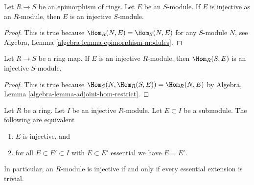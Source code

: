 \begin{lemma}
\label{lemma-injective-epimorphism}
Let $R \to S$ be an epimorphism of rings. Let $E$ be an $S$-module.
If $E$ is injective as an $R$-module, then $E$ is an injective $S$-module.
\end{lemma}

\begin{proof}
This is true because $\Hom_R(N, E) = \Hom_S(N, E)$ for any $S$-module $N$,
see Algebra, Lemma \ref{algebra-lemma-epimorphism-modules}.
\end{proof}

\begin{lemma}
\label{lemma-hom-injective}
Let $R \to S$ be a ring map. If $E$ is an injective $R$-module,
then $\Hom_R(S, E)$ is an injective $S$-module.
\end{lemma}

\begin{proof}
This is true because $\Hom_S(N, \Hom_R(S, E)) = \Hom_R(N, E)$ by
Algebra, Lemma \ref{algebra-lemma-adjoint-hom-restrict}.
\end{proof}

\begin{lemma}
\label{lemma-essential-extensions-in-injective}
Let $R$ be a ring. Let $I$ be an injective $R$-module. Let $E \subset I$
be a submodule. The following are equivalent
\begin{enumerate}
\item $E$ is injective, and
\item for all $E \subset E' \subset I$ with $E \subset E'$ essential
we have $E = E'$.
\end{enumerate}
In particular, an $R$-module is injective if and only if every essential
extension is trivial.
\end{lemma}

